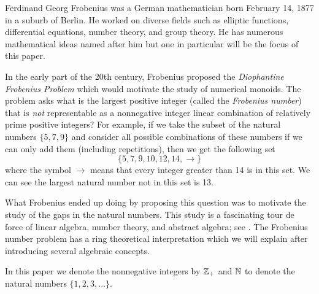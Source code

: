 
\begin{introduction}


Ferdinand Georg Frobenius was a German mathematician born February 14, 1877 in a suburb of Berlin. He worked on diverse fields such as elliptic functions, differential equations, number theory, and group theory. He has numerous mathematical ideas named after him but one in particular will be the focus of this paper. 

In the early part of the 20th century, Frobenius proposed the \emph{Diophantine Frobenius Problem} which would motivate the study of numerical monoids. The problem asks what is the largest positive integer (called the \emph{Frobenius number}) that is \emph{not} representable as a nonnegative integer linear combination of relatively prime positive integers? For example, if we take the subset of the natural numbers $\{5, 7, 9\}$ and consider all possible combinations of these numbers if we can only add them (including repetitions), then we get the following set
\[
	\{5, 7, 9, 10, 12, 14, \rightarrow \}
\]
where the symbol $\rightarrow$ means that every integer greater than 14 is in this set. We can see the largest natural number not in this set is 13.

What Frobenius ended up doing by proposing this question was to motivate the study of the gaps in the natural numbers. This study is a fascinating tour de force of linear algebra, number theory, and abstract algebra; see \cite{Numerical_book,Frobenius_book,factorizations1,Numerical_book2}. The Frobenius number problem has a ring theoretical interpretation which we will explain after introducing several algebraic concepts.

In this paper we denote the nonnegative integers by $\mathbb{Z}_+$ and $\mathbb{N}$ to denote the natural numbers $\{1, 2, 3, \ldots\}$.


\end{introduction}
